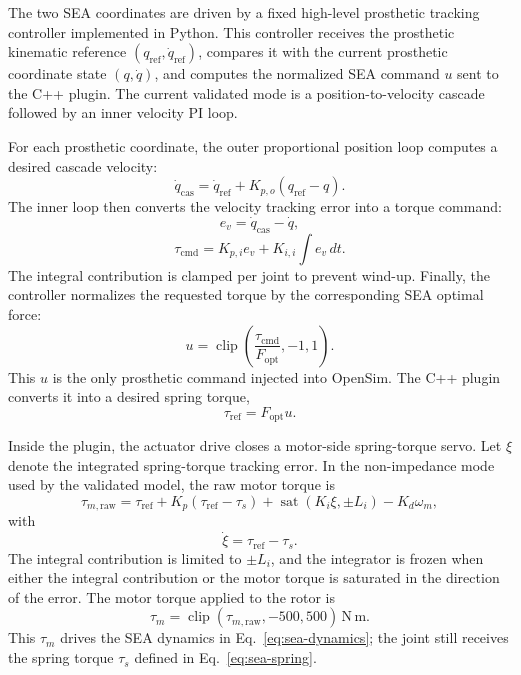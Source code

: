 The two SEA coordinates are driven by a fixed high-level prosthetic tracking
controller implemented in Python. This controller receives the prosthetic
kinematic reference \((q_{\mathrm{ref}},\dot{q}_{\mathrm{ref}})\), compares it
with the current prosthetic coordinate state \((q,\dot{q})\), and computes the
normalized SEA command \(u\) sent to the C++ plugin. The current validated mode
is a position-to-velocity cascade followed by an inner velocity PI loop.

For each prosthetic coordinate, the outer proportional position loop computes a
desired cascade velocity:
\begin{equation}
\dot{q}_{\mathrm{cas}} =
\dot{q}_{\mathrm{ref}}
+ K_{p,o}(q_{\mathrm{ref}} - q).
\label{eq:cascade-velocity}
\end{equation}
The inner loop then converts the velocity tracking error into a torque command:
\begin{equation}
e_v = \dot{q}_{\mathrm{cas}} - \dot{q},
\label{eq:velocity-error}
\end{equation}
\begin{equation}
\tau_{\mathrm{cmd}} =
K_{p,i}e_v
+ K_{i,i}\int e_v\,dt.
\label{eq:cascade-torque}
\end{equation}
The integral contribution is clamped per joint to prevent wind-up. Finally, the
controller normalizes the requested torque by the corresponding SEA optimal
force:
\begin{equation}
u =
\operatorname{clip}\left(
\frac{\tau_{\mathrm{cmd}}}{F_{\mathrm{opt}}},
-1,1
\right).
\label{eq:sea-command}
\end{equation}
This \(u\) is the only prosthetic command injected into OpenSim. The C++ plugin
converts it into a desired spring torque,
\begin{equation}
\tau_{\mathrm{ref}} = F_{\mathrm{opt}}u.
\label{eq:spring-reference}
\end{equation}

Inside the plugin, the actuator drive closes a motor-side spring-torque servo.
Let \(\xi\) denote the integrated spring-torque tracking error. In the
non-impedance mode used by the validated model, the raw motor torque is
\begin{equation}
\tau_{m,\mathrm{raw}} =
\tau_{\mathrm{ref}}
+ K_p(\tau_{\mathrm{ref}}-\tau_s)
+ \operatorname{sat}(K_i\xi,\pm L_i)
- K_d\omega_m ,
\label{eq:motor-servo}
\end{equation}
with
\begin{equation}
\dot{\xi} = \tau_{\mathrm{ref}} - \tau_s.
\label{eq:integral-state}
\end{equation}
The integral contribution is limited to \(\pm L_i\), and the integrator is
frozen when either the integral contribution or the motor torque is saturated in
the direction of the error. The motor torque applied to the rotor is
\begin{equation}
\tau_m =
\operatorname{clip}(\tau_{m,\mathrm{raw}}, -500, 500)\,\mathrm{N\,m}.
\label{eq:motor-clamp}
\end{equation}
This \(\tau_m\) drives the SEA dynamics in Eq.~\eqref{eq:sea-dynamics}; the
joint still receives the spring torque \(\tau_s\) defined in
Eq.~\eqref{eq:sea-spring}.

